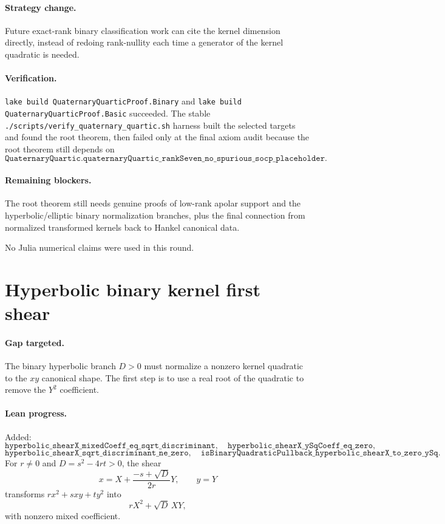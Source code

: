 \documentclass[11pt]{article}
\begin{document}
\paragraph{Strategy change.}
Future exact-rank binary classification work can cite the kernel dimension
directly, instead of redoing rank-nullity each time a generator of the kernel
quadratic is needed.

\paragraph{Verification.}
\texttt{lake build QuaternaryQuarticProof.Binary} and
\texttt{lake build QuaternaryQuarticProof.Basic} succeeded.  The stable
\texttt{./scripts/verify\_quaternary\_quartic.sh} harness built the selected
targets and found the root theorem, then failed only at the final axiom audit
because the root theorem still depends on
\[
\texttt{QuaternaryQuartic.quaternaryQuartic\_rankSeven\_no\_spurious\_socp\_placeholder}.
\]

\paragraph{Remaining blockers.}
The root theorem still needs genuine proofs of low-rank apolar support and the
hyperbolic/elliptic binary normalization branches, plus the final connection
from normalized transformed kernels back to Hankel canonical data.

No Julia numerical claims were used in this round.

\section*{Hyperbolic binary kernel first shear}

\paragraph{Gap targeted.}
The binary hyperbolic branch \(D>0\) must normalize a nonzero kernel quadratic
to the \(xy\) canonical shape.  The first step is to use a real root of the
quadratic to remove the \(Y^2\) coefficient.

\paragraph{Lean progress.}
Added:
\[
\texttt{hyperbolic\_shearX\_mixedCoeff\_eq\_sqrt\_discriminant},
\quad
\texttt{hyperbolic\_shearX\_ySqCoeff\_eq\_zero},
\]
\[
\texttt{hyperbolic\_shearX\_sqrt\_discriminant\_ne\_zero},
\quad
\texttt{isBinaryQuadraticPullback\_hyperbolic\_shearX\_to\_zero\_ySq}.
\]
For \(r\ne0\) and \(D=s^2-4rt>0\), the shear
\[
x=X+\frac{-s+\sqrt D}{2r}Y,\qquad y=Y
\]
transforms \(r x^2+sxy+ty^2\) into
\[
rX^2+\sqrt D\,XY,
\]
with nonzero mixed coefficient.
\end{document}
